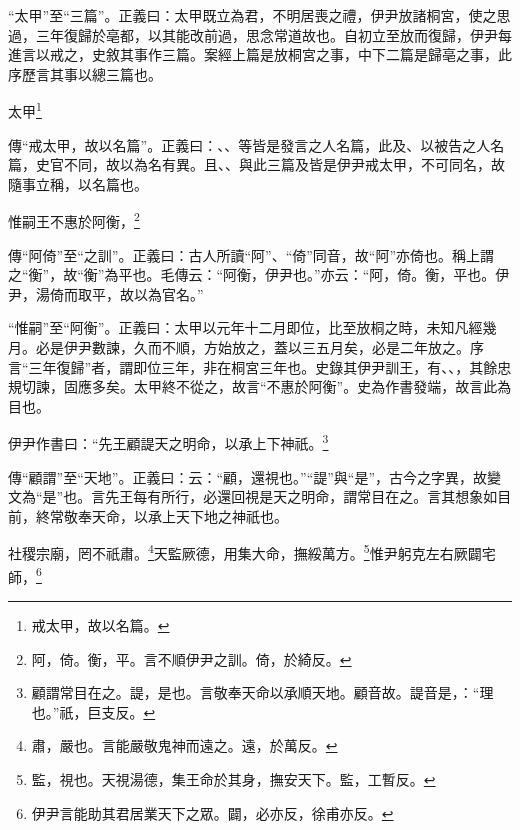{\noindent\shu{}\fzkt “太甲”至“三篇”。正義曰：太甲既立為君，不明居喪之禮，伊尹放諸桐宮，使之思過，三年復歸於亳都，以其能改前過，思念常道故也。自初立至放而復歸，伊尹每進言以戒之，史敘其事作三篇。案經上篇是放桐宮之事，中下二篇是歸亳之事，此序歷言其事以總三篇也。 \par}

太甲\footnote{戒太甲，故以名篇。}

{\noindent\zhuan{}\fzbyks 傳“戒太甲，故以名篇”。正義曰：、、等皆是發言之人名篇，此及、以被告之人名篇，史官不同，故以為名有異。且、、與此三篇及皆是伊尹戒太甲，不可同名，故隨事立稱，以名篇也。 \par}

惟嗣王不惠於阿衡，\footnote{阿，倚。衡，平。言不順伊尹之訓。倚，於綺反。}


{\noindent\zhuan{}\fzbyks 傳“阿倚”至“之訓”。正義曰：古人所讀“阿”、“倚”同音，故“阿”亦倚也。稱上謂之“衡”，故“衡”為平也。毛傳云：“阿衡，伊尹也。”亦云：“阿，倚。衡，平也。伊尹，湯倚而取平，故以為官名。” \par}

{\noindent\shu{}\fzkt “惟嗣”至“阿衡”。正義曰：太甲以元年十二月即位，比至放桐之時，未知凡經幾月。必是伊尹數諫，久而不順，方始放之，蓋以三五月矣，必是二年放之。序言“三年復歸”者，謂即位三年，非在桐宮三年也。史錄其伊尹訓王，有、、，其餘忠規切諫，固應多矣。太甲終不從之，故言“不惠於阿衡”。史為作書發端，故言此為目也。 \par}

伊尹作書曰：“先王顧諟天之明命，以承上下神祇。\footnote{顧謂常目在之。諟，是也。言敬奉天命以承順天地。顧音故。諟音是，：“理也。”祇，巨支反。}

{\noindent\zhuan{}\fzbyks 傳“顧謂”至“天地”。正義曰：云：“顧，還視也。”“諟”與“是”，古今之字異，故變文為“是”也。言先王每有所行，必還回視是天之明命，謂常目在之。言其想象如目前，終常敬奉天命，以承上天下地之神祇也。 \par}

社稷宗廟，罔不祇肅。\footnote{肅，嚴也。言能嚴敬鬼神而遠之。遠，於萬反。}天監厥德，用集大命，撫綏萬方。\footnote{監，視也。天視湯德，集王命於其身，撫安天下。監，工暫反。}惟尹躬克左右厥闢宅師，\footnote{伊尹言能助其君居業天下之眾。闢，必亦反，徐甫亦反。}


